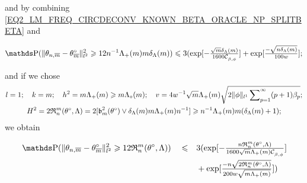 and by combining \ref{EQ2_LM_FREQ_CIRCDECONV_KNOWN_BETA_ORACLE_NP_SPLITBETA} and 

\begin{equation*}
\P (\Vert \theta_{n, \overline{m}} - \theta^{\circ}_{\overline{m}} \Vert_{l^{2}}^{2} \geq 12 n^{-1}\Lambda_{+}(m)m\cmiSv ) \leq 3 (\exp [- \tfrac{\sqrt{m}\cmiSv}{1600 \cst{\beta, \phi}} ] + \exp [ \tfrac{- \sqrt{n\cmiSv}}{100 w} ];
\end{equation*}

and if we chose
\begin{multline*}
l = 1; \quad k = m; \quad h^{2} = m \Lambda_{+}(m) \geqslant m \Lambda_{\circ}(m); \quad v = 4w^{-1} \sqrt{m} \Lambda_{+}(m) \sqrt{2 \Vert \phi \Vert_{l^{1}} \sum\nolimits_{p = 1}^{\infty} (p + 1)\beta_{p}};\\
H^{2} = 2 \mathfrak{R}_{n}^{m}(\theta^{\circ}, \Lambda) = 2 [\operatorname{\mathfrak{b}}_{m}^{2}(\theta^{\circ}) \vee \delta_{\Lambda}(m) m \Lambda_{+}(m) n^{-1}] \geqslant n^{-1} \Lambda_{+}(m) m (\delta_{\Lambda}(m) + 1);
\end{multline*}
we obtain

\begin{alignat*}{3}
& \P (\Vert \theta_{n, \overline{m}} - \theta^{\circ}_{\overline{m}} \Vert_{l^{2}}^{2} \geq 12\daRa{\Di}{(\xdf,\Lambda)}) && \leq && 3  (\exp [- \tfrac{n \mathfrak{R}_{n}^{m}(\theta^{\circ}, \Lambda)}{1600 \sqrt{m} \Lambda_{+}(m) \cst{\beta, \phi}} ]\\
& && && + \exp [ \tfrac{-n \sqrt{2 \mathfrak{R}_{n}^{m}(\theta^{\circ}, \Lambda)}}{200 w \sqrt{m \Lambda_{+}(m)}} ] )
\end{alignat*}

